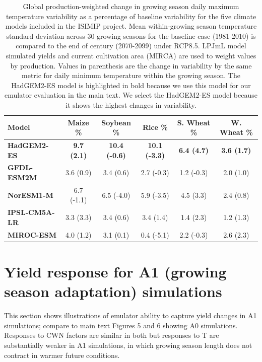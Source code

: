 \documentclass[12pt]{article}
\begin{document}
\begin{table}[ht]
{\small
    \caption{
    Global production-weighted change in growing season daily maximum temperature variability as a percentage of baseline variability for the five climate models included in the ISIMIP project. 
    Mean within-growing season temperature standard deviation across 30 growing seasons for the baseline case (1981-2010) is compared to the end of century (2070-2099) under RCP8.5.
    LPJmL model simulated yields and current cultivation area (MIRCA) are used to weight values by production.
    Values in parenthesis are the change in variability by the same metric for daily minimum temperature within the growing season.
    The HadGEM2-ES model is highlighted in bold because we use this model for our emulator evaluation in the main text. We select the HadGEM2-ES model because it shows the highest changes in variability.
    }
    \begin{tabular}{l | c | c | c | c | c} 
        \hline
        \textbf{Model} & \textbf{Maize \%} & \textbf{Soybean \%} & \textbf{Rice \%} & \textbf{S. Wheat \%} & \textbf{W. Wheat \%} \\ \hline
        \textbf{HadGEM2-ES}     & \textbf{9.7 (2.1)}  & \textbf{10.4 (-0.6)}  & \textbf{10.1 (-3.3)}  & \textbf{6.4 (4.7)}  & \textbf{3.6 (1.7)}  \\ \hline
        \textbf{GFDL-ESM2M}     & 3.6 (0.9)  & 3.4 (0.6)  & 2.7 (-0.3)  & 1.2 (-0.3) & 2.0 (1.0)  \\ \hline
        \textbf{NorESM1-M}      & 6.7 (-1.1)  & 6.5 (-4.0)  & 5.9 (-3.5)  & 4.5 (3.3)  & 2.4 (0.8)    \\ \hline
        \textbf{IPSL-CM5A-LR}   & 3.3 (3.3)  & 3.4 (0.6)  & 3.4 (1.4)  & 1.4 (2.3)  & 1.2 (1.3)  \\ \hline
        \textbf{MIROC-ESM} & 4.0 (1.2)  & 3.1 (0.1)  & 0.4 (-5.1)  & 2.2 (-0.3)  & 2.6 (2.3)  \\ \hline
    \end{tabular}
}
\end{table}

\clearpage
\section{Yield response for A1 (growing season adaptation) simulations}
\begin{flushleft}
	This section shows illustrations of emulator ability to capture yield changes in A1 simulations; compare to main text Figures 5 and 6 showing A0 simulations. Responses to CWN factors are similar in both but responses to T are substantially weaker in A1 simulations, in which growing season length does not contract in warmer future conditions.
\end{flushleft}
\end{document}
